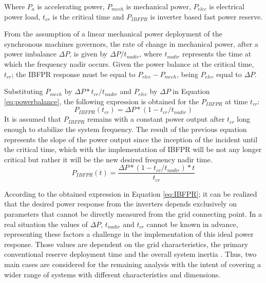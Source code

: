 Where $ P_a $ is accelerating power, $ P_{mech} $ is mechanical power, $ P_{elec} $ is electrical power load, $ t_{cr} $ is the critical time and $ P_{IBFPR} $ is inverter based fast power reserve.

From the assumption of a linear mechanical power deployment of the synchronous machines governors, the rate of change in mechanical power, after a power imbalance $ \Delta P $, is given by $ \Delta P/t_{nadir} $, where $ t_{nadir} $ represents the time at which the frequency nadir occurs. Given the power balance at the critical time, $ t_{cr} $; the IBFPR response must be equal to $ P_{elec}-P_{mech} $, being $ P_{elec} $ equal to $ \Delta P $.


Substituting $ P_{mech} $ by $ \Delta P* t_{cr} /t_{nadir} $ and $ P_{elec} $ by $ \Delta P $ in Equation \eqref{eq:powerbalance}, the following expression is obtained for the $ P_{IBFPR} $ at time $ t_{cr} $:
\begin{equation}
\label{eq:p_at_tcr}
P_{IBFPR} (t_{cr} )=\Delta P*(1-t_{cr}/t_{nadir} )
\end{equation}
It is assumed that $ P_{IBFPR} $ remains with a constant power output after $ t_{cr} $ long enough to stabilize the system frequency. The result of the previous equation represents the slope of the power output since the inception of the incident until the critical time, which with the implementation of IBFPR will be not any longer critical but rather it will be the new desired frequency nadir time.
\begin{equation}
\label{eq:IBFPR}
P_{IBFPR} (t)=\dfrac{\Delta P*(1-t_{cr}/t_{nadir} )*t}{t_{cr}}
\end{equation}

According to the obtained expression in Equation \eqref{eq:IBFPR}; it can be realized that the desired power response from the inverters depends exclusively on parameters that cannot be directly measured from the grid connecting point. In a real situation the values of $\Delta P$, $ t_{nadir} $ and $ t_{cr} $ cannot be known in advance, representing these factors a challenge in the implementation of this ideal power response. Those values are dependent on the grid characteristics, the primary conventional reserve deployment time and the overall system inertia \cite{orum2015future}. Thus, two main cases are considered for the remaining analysis with the intent of covering a wider range of systems with different characteristics and dimensions.

